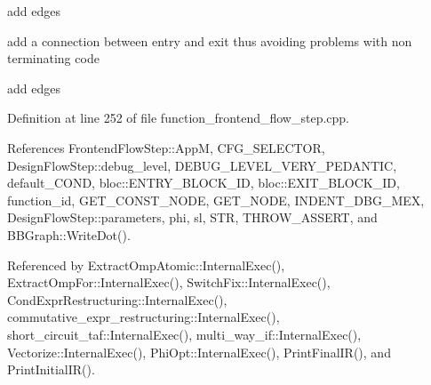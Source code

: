 add edges

add a connection between entry and exit thus avoiding problems with non terminating code

add edges 

Definition at line 252 of file function\+\_\+frontend\+\_\+flow\+\_\+step.\+cpp.



References Frontend\+Flow\+Step\+::\+AppM, C\+F\+G\+\_\+\+S\+E\+L\+E\+C\+T\+OR, Design\+Flow\+Step\+::debug\+\_\+level, D\+E\+B\+U\+G\+\_\+\+L\+E\+V\+E\+L\+\_\+\+V\+E\+R\+Y\+\_\+\+P\+E\+D\+A\+N\+T\+IC, default\+\_\+\+C\+O\+ND, bloc\+::\+E\+N\+T\+R\+Y\+\_\+\+B\+L\+O\+C\+K\+\_\+\+ID, bloc\+::\+E\+X\+I\+T\+\_\+\+B\+L\+O\+C\+K\+\_\+\+ID, function\+\_\+id, G\+E\+T\+\_\+\+C\+O\+N\+S\+T\+\_\+\+N\+O\+DE, G\+E\+T\+\_\+\+N\+O\+DE, I\+N\+D\+E\+N\+T\+\_\+\+D\+B\+G\+\_\+\+M\+EX, Design\+Flow\+Step\+::parameters, phi, sl, S\+TR, T\+H\+R\+O\+W\+\_\+\+A\+S\+S\+E\+RT, and B\+B\+Graph\+::\+Write\+Dot().



Referenced by Extract\+Omp\+Atomic\+::\+Internal\+Exec(), Extract\+Omp\+For\+::\+Internal\+Exec(), Switch\+Fix\+::\+Internal\+Exec(), Cond\+Expr\+Restructuring\+::\+Internal\+Exec(), commutative\+\_\+expr\+\_\+restructuring\+::\+Internal\+Exec(), short\+\_\+circuit\+\_\+taf\+::\+Internal\+Exec(), multi\+\_\+way\+\_\+if\+::\+Internal\+Exec(), Vectorize\+::\+Internal\+Exec(), Phi\+Opt\+::\+Internal\+Exec(), Print\+Final\+I\+R(), and Print\+Initial\+I\+R().

